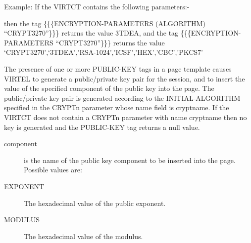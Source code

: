\documentclass[letterpaper,10pt,english]{sphinxmanual}
\begin{document}
Example: If the VIRTCT contains the following parameters:-

\begin{sphinxVerbatim}[commandchars=\\\{\}]
 
 
\end{sphinxVerbatim}

then the tag \{\{\{ENCRYPTION-PARAMETERS (ALGORITHM) “CRYPT3270”\}\}\} returns the value 3TDEA, and the tag \{\{\{ENCRYPTION-PARAMETERS “CRYPT3270”\}\}\}
returns the value ‘CRYPT3270’,‘3TDEA’,’RSA-1024’,’ICSF’,’HEX’,’CBC’,’PKCS7’


\begin{sphinxVerbatim}[commandchars=\\\{\}]
  
\end{sphinxVerbatim}

The presence of one or more PUBLIC-KEY tags in a page template causes VIRTEL to generate a public/private key pair for the session, and to insert the value of the specified component of the public key into the page. The public/private key pair is generated according to the INITIAL-ALGORITHM specified in the CRYPTn parameter whose name field is cryptname. If the VIRTCT does not contain a CRYPTn parameter with name cryptname then no key is generated and
the PUBLIC-KEY tag returns a null value.
\begin{description}
\item[{component}] \leavevmode
is the name of the public key component to be inserted into the page. Possible values are:

\item[{EXPONENT}] \leavevmode
The hexadecimal value of the public exponent.

\item[{MODULUS}] \leavevmode
The hexadecimal value of the modulus.

\end{description}
\end{document}
